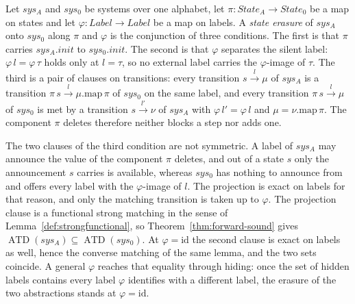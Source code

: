 \begin{definition}
  \label{def:erasure-sim}
  \leanok
  Let $sys_A$ and $sys_0$ be systems over one alphabet, let $\pi : State_A \to State_0$ be a map on states and let $\varphi : Label \to Label$ be a map on labels.
  A \emph{state erasure} of $sys_A$ onto $sys_0$ along $\pi$ and $\varphi$ is the conjunction of three conditions.
  The first is that $\pi$ carries $sys_A.init$ to $sys_0.init$.
  The second is that $\varphi$ separates the silent label: $\varphi\,l = \varphi\,\tau$ holds only at $l = \tau$, so no external label carries the $\varphi$-image of $\tau$.
  The third is a pair of clauses on transitions: every transition $s \xrightarrow{l} \mu$ of $sys_A$ is a transition $\pi\,s \xrightarrow{l} \mu.\mathrm{map}\,\pi$ of $sys_0$ on the same label, and every transition $\pi\,s \xrightarrow{l} \mu$ of $sys_0$ is met by a transition $s \xrightarrow{l'} \nu$ of $sys_A$ with $\varphi\,l' = \varphi\,l$ and $\mu = \nu.\mathrm{map}\,\pi$.
  The component $\pi$ deletes therefore neither blocks a step nor adds one.

  The two clauses of the third condition are not symmetric.
  A label of $sys_A$ may announce the value of the component $\pi$ deletes, and out of a state $s$ only the announcement $s$ carries is available, whereas $sys_0$ has nothing to announce from and offers every label with the $\varphi$-image of $l$.
  The projection is exact on labels for that reason, and only the matching transition is taken up to $\varphi$.
  The projection clause is a functional strong matching in the sense of Lemma~\ref{def:strongfunctional}, so Theorem~\ref{thm:forward-sound} gives $\operatorname{ATD}(sys_A) \subseteq \operatorname{ATD}(sys_0)$.
  At $\varphi = \mathrm{id}$ the second clause is exact on labels as well, hence the converse matching of the same lemma, and the two sets coincide.
  A general $\varphi$ reaches that equality through hiding: once the set of hidden labels contains every label $\varphi$ identifies with a different label, the erasure of the two abstractions stands at $\varphi = \mathrm{id}$.


\end{definition}

